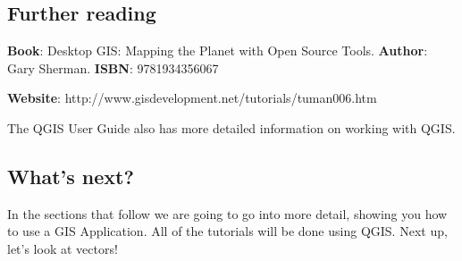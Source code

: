 \subsection{Further reading}

\textbf{Book}: Desktop GIS: Mapping the Planet with Open Source Tools.
\textbf{Author}: Gary Sherman. \textbf{ISBN}: 9781934356067 \cite{sherman08} 

\textbf{Website}: http://www.gisdevelopment.net/tutorials/tuman006.htm

The QGIS User Guide also has more detailed information on working with QGIS.

\subsection{What's next?}

In the sections that follow we are going to go into more detail, showing you
how to use a GIS Application. All of the tutorials will be done using QGIS.
Next up, let's look at vectors!

